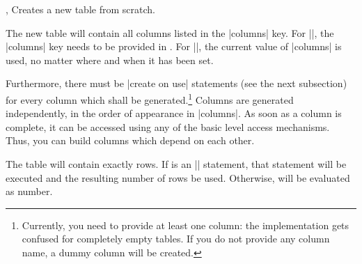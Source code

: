 \documentclass[a4paper]{ltxdoc}
\begin{document}
\begin{commandlist}{%
    \pgfplotstablenew{},
    \pgfplotstablenew*{}%
}
    Creates a new table from scratch.

    The new table will contain all columns listed in the |columns| key. For
    |\pgfplotstablenew|, the |columns| key needs to be provided in
    . For |\pgfplotstablenew*|, the current value of |columns| is
    used, no matter where and when it has been set.

    Furthermore, there must be |create on use| statements (see the next
    subsection) for every column which shall be generated.\footnote{Currently,
    you need to provide at least one column: the implementation gets confused
    for completely empty tables. If you do not provide any column name, a dummy
    column will be created.} Columns are generated independently, in the order
    of appearance in |columns|. As soon as a column is complete, it can be
    accessed using any of the basic level access mechanisms. Thus, you can
    build columns which depend on each other.

    The table will contain exactly  rows. If 
    is an |\pgfplotstablegetrowsof| statement, that statement will be executed
    and the resulting number of rows be used. Otherwise,  will
    be evaluated as number.
\begin{codeexample}[]
\loadedtable
\pgfplotstabletypeset[empty cells with={---}]\loadedtable
\end{codeexample}

\begin{codeexample}[]
    \loadedtable
\pgfplotstabletypeset\loadedtable
\end{codeexample}
\end{commandlist}
\end{document}
